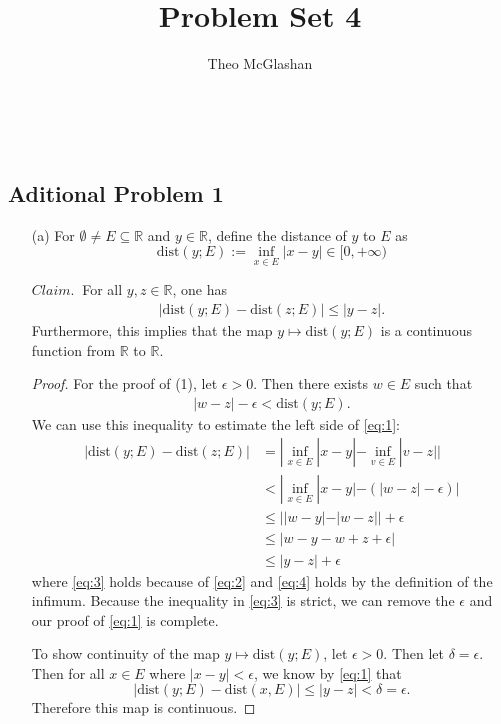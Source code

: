 \documentclass[12pt]{article}
\title{Problem Set 4}
\author{Theo McGlashan}
\date{}
\def\R{\mathbb{R}}
\begin{document}
\maketitle
\newpage
\
\newpage

\subsection*{Aditional Problem 1}

\begin{itemize}
    \item[(a)] For $\emptyset \neq E \subseteq \R$ and $y \in \R$, define the distance of $y$ to $E$ as $$\text{dist}(y; E) := \inf_{x \in E} |x - y| \in [0, + \infty)$$
    
    $Claim.~$ For all $y, z \in \R$, one has 
    \begin{align}
        |\text{dist}(y; E) - \text{dist}(z; E)| \leq |y - z|. \label{eq:1}
    \end{align}
    Furthermore, this implies that the map $y \mapsto \text{dist}(y; E)$ is a continuous function from $\R$ to $\R$.

    \begin{proof}
        For the proof of (1), let $\epsilon > 0$. Then there exists $w \in E$ such that \begin{align}
            |w - z| - \epsilon < \text{dist}(y; E). \label{eq:2}
        \end{align}
        We can use this inequality to estimate the left side of \eqref{eq:1}:
        \begin{align}
            |\text{dist}(y;  E) - \text{dist}(z; E)| &= |\inf_{x \in E} |x - y| - \inf_{v \in E} |v - z| | \nonumber \\
            &< |\inf_{x \in E} |x - y| - (|w - z| - \epsilon) | \label{eq:3}\\
            &\leq ||w - y| - |w - z| | + \epsilon \label{eq:4} \\
            &\leq |w-y-w+z+\epsilon| \nonumber \\
            &\leq |y - z| + \epsilon \nonumber
        \end{align}
        where \eqref{eq:3} holds because of \eqref{eq:2} and \eqref{eq:4} holds by the definition of the infimum. Because the inequality in \eqref{eq:3} is strict, we can remove the $\epsilon$ and our proof of \eqref{eq:1} is complete.

        To show continuity of the map $y \mapsto \text{dist}(y; E)$, let $\epsilon > 0$. Then let $\delta = \epsilon$. Then for all $x \in E$ where $|x - y| < \epsilon$, we know by \eqref{eq:1} that $$|\text{dist}(y; E) - \text{dist}(x, E)| \leq |y - z| < \delta = \epsilon.$$ Therefore this map is continuous.
    \end{proof}


\end{itemize}
\end{document}
